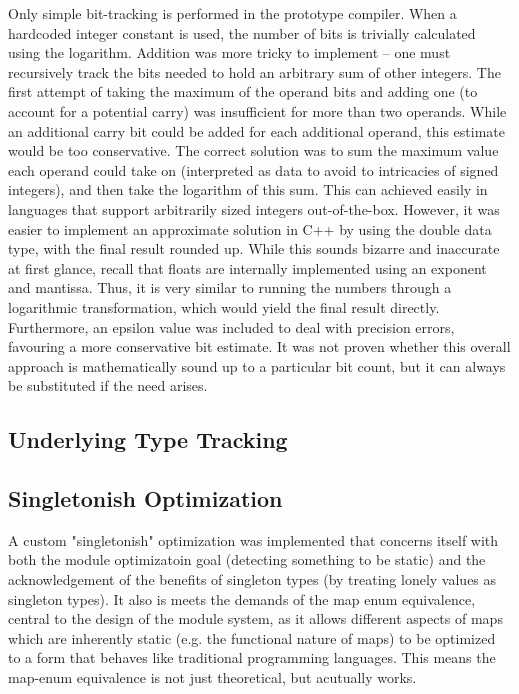 \documentclass[12pt,a4paper,twoside]{report}
\begin{document}
Only simple bit-tracking is performed in the prototype compiler. When a hardcoded integer constant is used, the number of bits is trivially calculated using the logarithm. Addition was more tricky to implement -- one must recursively track the bits needed to hold an arbitrary sum of other integers. The first attempt of taking the maximum of the operand bits and adding one (to account for a potential carry) was insufficient for more than two operands. While an additional carry bit could be added for each additional operand, this estimate would be too conservative. The correct solution was to sum the maximum value each operand could take on (interpreted as data to avoid to intricacies of signed integers), and then take the logarithm of this sum. This can achieved easily in languages that support arbitrarily sized integers out-of-the-box. However, it was easier to implement an approximate solution in C++ by using the double data type, with the final result rounded up. While this sounds bizarre and inaccurate at first glance, recall that floats are internally implemented using an exponent and mantissa. Thus, it is very similar to running the numbers through a logarithmic transformation, which would yield the final result directly. Furthermore, an epsilon value was included to deal with precision errors, favouring a more conservative bit estimate. It was not proven whether this overall approach is mathematically sound up to a particular bit count, but it can always be substituted if the need arises.

\subsection{Underlying Type Tracking}

\subsection{Singletonish Optimization}

A custom "singletonish" optimization was implemented that concerns itself with both the module optimizatoin goal (detecting something to be static) and the acknowledgement of the benefits of singleton types (by treating lonely values as singleton types). It also is meets the demands of the map enum equivalence, central to the design of the module system, as it allows different aspects of maps which are inherently static (e.g. the functional nature of maps) to be optimized to a form that behaves like traditional programming languages. This means the map-enum equivalence is not just theoretical, but acutually works.
\end{document}
